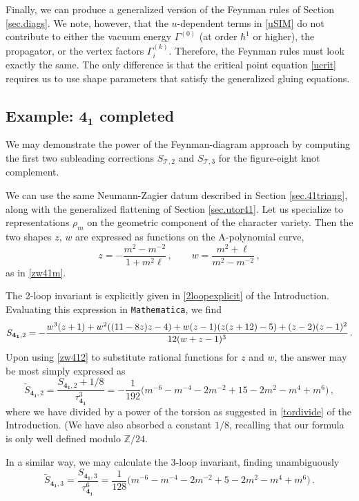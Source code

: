 \documentclass[12pt]{amsart}
\theoremstyle{definition}
\def\BZ{\mathbb Z}
\def\be{  \begin{equation} }
\def\ee{  \end{equation} }
\newcommand{\CT}{\mathcal{T}}
\newcommand{\wt}{\widetilde}
\newcommand{\mb}{\mathbf}
\numberwithin{equation}{section}
\begin{document}
Finally, we can produce a generalized version of the Feynman rules of Section \ref{sec.diags}. We note, however, that the $u$-dependent terms in \eqref{uSIM} do not contribute to either the vacuum energy $\Gamma^{(0)}$ (at order $\hbar^1$ or higher), the propagator, or the vertex factors $\Gamma^{(k)}_i$. Therefore, the Feynman rules must look exactly the same. The only difference is that the critical point equation \eqref{ucrit} requires us to use shape parameters that satisfy the generalized gluing equations.





\subsection{Example: $\mb{4_1}$ completed}
\label{sec.41Sn}

We may demonstrate the power of the Feynman-diagram approach by computing the first two subleading corrections $S_{\CT,2}$ and $S_{\CT,3}$ for the figure-eight knot complement.

We can use the same Neumann-Zagier datum described in Section \ref{sec.41triang}, along with the generalized flattening of Section \ref{sec.utor41}. Let us specialize to representations $\rho_m$ on the geometric component of the character variety. Then the two shapes $z,\,w$ are expressed as functions on the A-polynomial curve,
%
\be \label{zw412} z = -\frac{m^2-m^{-2}}{1+m^2\ell} \,,\qquad w= \frac{m^2+\ell}{m^2-m^{-2}}\,,\ee
%
as in \eqref{zw41m}.

The 2-loop invariant is explicitly given in \eqref{2loopexplicit} of the Introduction. Evaluating this expression in \texttt{Mathematica}, we find
%
\be\notag S_{\mb{4_1},2}=-\frac{w^3 (z+1)+w^2 ((11-8 z) z-4)+w (z-1) (z (z+12)-5)+(z-2) (z-1)^2}{12 (w+z-1)^3}\,. \ee
%
Upon using \eqref{zw412} to substitute rational functions for $z$ and $w$, the answer may be most simply expressed as
%
\be \wt S_{\mb {4_1},2}= \frac{S_{\mb {4_1},2}+1/8}{\tau_{\mb {4_1}}^3} = -\frac{1}{192}\big(m^{-6}-m^{-4}-2m^{-2}+15-2m^2-m^4+m^6\big)\,,\ee
%
where we have divided by a power of the torsion as suggested in \eqref{tordivide} of the Introduction. (We have also absorbed a constant $1/8$, recalling that our formula is only well defined modulo $\BZ/24$.

In a similar way, we may calculate the 3-loop invariant, finding unambiguously
%
\be \wt S_{\mb{4_1},3} = \frac{S_{\mb{4_1},3}}{\tau_{\mb{4_1}}^6}=\frac{1}{128}\big(m^{-6}-m^{-4}-2m^{-2}+5-2m^2-m^4+m^6\big)\,.\ee
\end{document}
